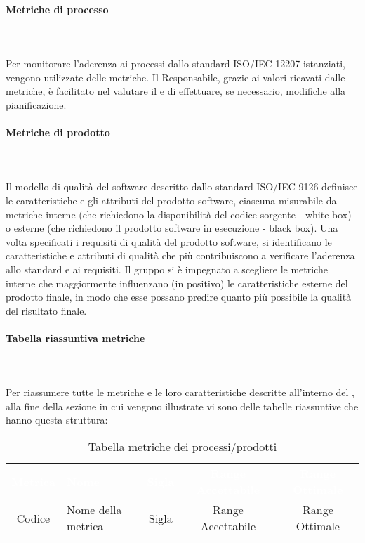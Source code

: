 \paragraph{Metriche di processo}\mbox{}\\ \\
Per monitorare l'aderenza ai processi dallo standard ISO/IEC 12207 istanziati, vengono utilizzate delle metriche. Il Responsabile, grazie ai valori ricavati dalle metriche, è facilitato nel
valutare il  e di effettuare, se necessario, modifiche alla pianificazione.\\

\paragraph{Metriche di prodotto}\mbox{}\\ \\
Il modello di qualità del software descritto dallo standard ISO/IEC 9126 definisce le caratteristiche e gli attributi del prodotto software, ciascuna misurabile da metriche interne (che richiedono la disponibilità del codice sorgente - white box) o esterne (che richiedono il prodotto software in esecuzione - black box).
Una volta specificati i requisiti di qualità del prodotto software, si identificano le caratteristiche e attributi di qualità che più contribuiscono a verificare l'aderenza allo standard e ai requisiti.
Il gruppo \Gruppo{} si è impegnato a scegliere le metriche interne che maggiormente influenzano (in positivo) le caratteristiche esterne del prodotto finale, in modo che esse possano predire quanto più possibile la qualità del risultato finale. 

\paragraph{Tabella riassuntiva metriche}\mbox{}\\ \\
Per riassumere tutte le metriche e le loro caratteristiche descritte all'interno del \PdQ{}, alla fine della sezione in cui vengono illustrate vi sono delle tabelle riassuntive che hanno questa struttura:
{
\renewcommand{\arraystretch}{1.5}
\begin{longtable}{ c C{4cm} c c c}
\caption{Tabella metriche dei processi/prodotti}\\
\textcolor{white}{\textbf{Metrica}} & \textcolor{white}{\textbf{Nome}} & \textcolor{white}{\textbf{Sigla}} & \textcolor{white}{\textbf{Range Accettabile}} & \textcolor{white}{\textbf{Range Ottimale}}\\
Codice & Nome della metrica & Sigla & Range Accettabile & Range Ottimale \\
\end{longtable}
}

